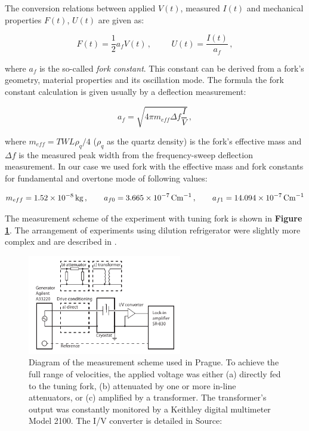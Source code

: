The conversion relations between applied $V(t)$, measured $I(t)$ and mechanical properties $F(t)$, $U(t)$ are given \cite{forks} as:

\begin{equation}
F(t) = \frac{1}{2} a_{f} V(t)\,,
\hspace{1cm}
U(t) = \frac{I(t)}{a_{f}}\,,
\label{fork_conversions}
\end{equation}

where $a_{f}$ is the so-called \textit{fork constant}. This constant can be derived from a fork's geometry, material properties and its oscillation mode. The formula the fork constant calculation is given usually by a deflection measurement:

\begin{equation}
a_{f} = \sqrt{4\pi m_{eff} \Delta f \frac{I}{V}}\,,
\end{equation}

where $m_{eff} = TWL\rho_q /4$ ($\rho_q$ as the quartz density) is the fork's effective mass and $\Delta f$ is the measured peak width from the frequency-sweep deflection measurement. In our case we used fork with the effective mass and fork constants for fundamental and overtone mode of following values:

\begin{equation}
m_{eff} = 1.52 \times 10^{-8} \,\mathrm{kg}\,,
\hspace{7mm}
a_{f0} = 3.665 \times 10^{-7} \,\mathrm{Cm}^{-1}\,,
\hspace{7mm}
a_{f1} = 14.094 \times 10^{-7} \,\mathrm{Cm}^{-1}
\end{equation}

The measurement scheme of the experiment with tuning fork is shown in \textbf{Figure \ref{setup}}. The arrangement of experiments using dilution refrigerator were slightly more complex and are described in \cite{skyba} .

\begin{figure}[h]
	\centering
	\includegraphics[width=0.6\textwidth]{graphics/exp/fork_setup}
	\caption{Diagram of the measurement scheme used in Prague. To achieve the full range of velocities, the applied voltage was either (a) directly fed to the tuning fork, (b) attenuated by one or more in-line attenuators, or (c) amplified by a transformer. The transformer’s output was constantly monitored by a Keithley digital multimeter Model 2100. The I/V converter is detailed in \cite{holt} Source:\cite{multiple-vels}}
	\label{setup}
\end{figure}

